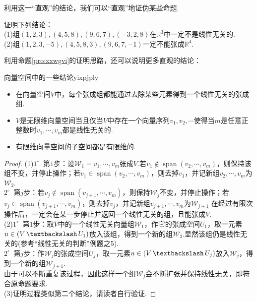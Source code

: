 \documentclass[lang=cn, zihao=5]{elegantbook}
\newcommand{\R}{\mathbb{R}}
\newcommand{\buzhou}[1]{$#1^{\circ} \ $}
\DeclareMathOperator{\spn}{span}
\DeclareMathOperator{\setjianfa}{\textbackslash}
\begin{document}
利用这一“直观”的结论，我们可以“直观”地证伪某些命题.

\begin{example}
	证明下列结论： \\
	(1)组$(1,2,3),(4,5,8),(9,6,7),(-3,2,8)$在$\R ^{3}$中一定不是线性无关的. \\
	(2)组$(1,2,3,-5),(4,5,8,3),(9,6,7,-1)$一定不能张成$\R ^{4}$.
\end{example}

利用命题\ref{pro:xxwgvi}的证明思路，还可以说明更多直观的结论：

\begin{proposition}{向量空间中的一些结论}{yixpjply}
	\begin{itemize}
		\item 在向量空间$V$中，每个张成组都能通过去除某些元素得到一个线性无关的张成组.
		\item $V$是无限维向量空间当且仅当$V$中存在一个向量序列$v_1, v_2, \cdots$使得当$m$是任意正整数时$v_1, \cdots ,v_m$都是线性无关的.
		\item 有限维向量空间的子空间都是有限维的.
	\end{itemize}
\end{proposition}
\begin{proof}
	(1)\buzhou{1} 第$1$步：设$\mathcal{W}_1 = v_1, \cdots ,v_m$张成$V$.若$v_1 \notin \spn (v_2, \cdots ,v_m)$，则保持该组不变，并停止操作；若$v_1 \in \spn (v_2, \cdots ,v_m)$，则去掉$v_1$，并记新组$v_2, \cdots , v_m$为$\mathcal{W}_2$. \\
	\buzhou{2} 第$j$步：若$v_j \notin \spn (v_{j+1}, \cdots ,v_m)$，则保持$\mathcal{W}_j$不变，并停止操作；若$v_j \in \spn (v_{j+1}, \cdots ,v_m)$，则去掉$v_j$，并记新组$v_{j+1}, \cdots , v_m$为$\mathcal{W}_{j+1}$
	在经过有限次操作后，一定会在某一步停止并返回一个线性无关的组，且能张成$V$. \\
	(2)\buzhou{1} 第$1$步：取$V$中的一个线性无关向量组$\mathcal{W}_1$，作它的张成空间$U_1$，取一元素$u \in (V \setjianfa U_1)$放入该组，得到一个新的组$\mathcal{W}_2$.显然该组仍是线性无关的(参考“线性无关的判断”例题之5). \\
	\buzhou{2} 第$j$步：作$\mathcal{W}_j$的张成空间$U_j$，取一元素$u \in (V \setjianfa U_j)$放入$\mathcal{W}_j$，得到一个新的组$\mathcal{W}_{j+1}$. \\
	由于可以不断重复该过程，因此这样一个组$\mathcal{W}_j$会不断扩张并保持线性无关，即符合原命题要求. \\
	(3)证明过程类似第二个结论，请读者自行验证.
\end{proof}
\end{document}
